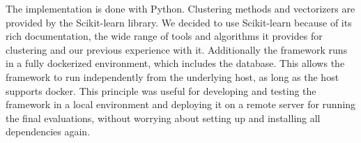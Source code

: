 The implementation is done with Python. Clustering methods and vectorizers are provided by the Scikit-learn library\cite{scikit-learn}. We decided to use Scikit-learn because of its rich documentation, the wide range of tools and algorithms it provides for clustering and our previous experience with it. Additionally the framework runs in a fully dockerized environment, which includes the database. This allows the framework to run independently from the underlying host, as long as the host supports docker. This principle was useful for developing and testing the framework in a local environment and deploying it on a remote server for running the final evaluations, without worrying about setting up and installing all dependencies again.

